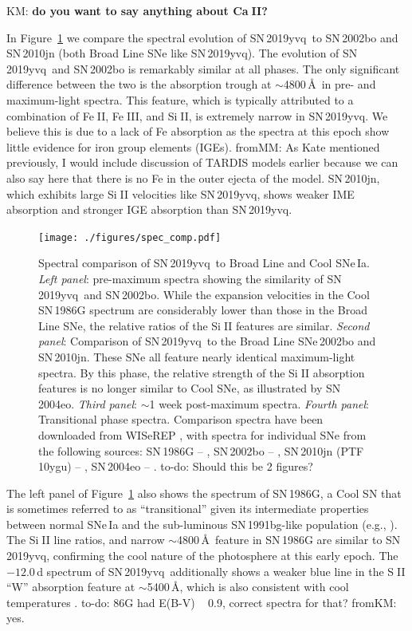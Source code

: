 \documentclass[twocolumn]{aastex63}
\def\ion#1#2{#1$\;${\footnotesize\rm{#2}}\relax}
\newcommand{\kate}[1]{{\color{red} KM: \textbf{#1}}}
\newcommand{\fromkate}[1]{{\color{brown} fromKM: {#1}}}
\newcommand{\frommark}[1]{{\color{orange} fromMM: {#1}}}
\newcommand{\todo}[1]{{\color{magenta} to-do: {#1}}}
\newcommand{\sn}{SN\,2019yvq}
\begin{document}
\kate{do you want to say anything about \ion{Ca}{II}?}


In Figure~\ref{fig:spec_comp} we compare the spectral evolution of \sn\ to
SN\,2002bo and SN\,2010jn (both \citet{Branch06} Broad Line SNe like \sn).
The evolution of \sn\ and SN\,2002bo is remarkably similar at all phases. The
only significant difference between the two is the absorption trough at
$\sim$4800\,\AA\ in pre- and maximum-light spectra. This feature, which is
typically attributed to a combination of \ion{Fe}{II}, \ion{Fe}{III}, and
\ion{Si}{II}, is extremely narrow in \sn. We believe this is due to a lack of
Fe absorption as the spectra at this epoch show little evidence for iron group
elements (IGEs). \frommark{As Kate mentioned previously, I would include discussion of TARDIS models earlier because we can also say here that there is no Fe in the outer ejecta of the model}. SN\,2010jn, which exhibits large \ion{Si}{II} velocities
like \sn, shows weaker IME absorption and stronger IGE absorption than \sn.

\begin{figure}
    \centering
    \texttt{[image: ./figures/spec\_comp.pdf]}
    \caption{Spectral comparison of \sn\ to \citet{Branch06} Broad Line and
    Cool SNe\,Ia. \textit{Left panel}: pre-maximum spectra showing the
    similarity of \sn\ and SN\,2002bo. While the expansion velocities in the
    Cool SN\,1986G spectrum are considerably lower than those in the Broad
    Line SNe, the relative ratios of the \ion{Si}{II} features are similar.
    \textit{Second panel}: Comparison of \sn\ to the Broad Line SNe\,2002bo
    and SN\,2010jn. These SNe all feature nearly identical maximum-light
    spectra. By this phase, the relative strength of the \ion{Si}{II}
    absorption features is no longer similar to \citet{Branch06} Cool SNe, as
    illustrated by SN\,2004eo. \textit{Third panel}: $\sim$1 week post-maximum
    spectra. \textit{Fourth panel}: Transitional phase spectra. Comparison
    spectra have been downloaded from WISeREP \citep{Yaron12}, with spectra
    for individual SNe from the following sources: SN\,1986G --
    \citet{Cristiani92}, SN\,2002bo -- \citet{Benetti04,Silverman11},
    SN\,2010jn (PTF\,10ygu) -- \citet{Hachinger13,Maguire14}, SN\,2004eo --
    \citet{Pastorello07}. \todo{Should this be 2 figures?}}
    \label{fig:spec_comp}
\end{figure}

The left panel of Figure~\ref{fig:spec_comp} also shows the spectrum of
SN\,1986G, a \citet{Branch06} Cool SN that is sometimes referred to as
``transitional'' given its intermediate properties between normal SNe\,Ia and
the sub-luminous SN\,1991bg-like population (e.g., \citealt{Pastorello07}).
The \ion{Si}{II} line ratios, and narrow $\sim$4800\,\AA\ feature in SN\,1986G
are similar to \sn, confirming the cool nature of the photosphere at this
early epoch. The $-12.0$\,d spectrum of \sn\ additionally shows a weaker blue
line in the \ion{S}{II} ``W'' absorption feature at $\sim$5400\,\AA, which is
also consistent with cool temperatures \citep{Nugent95}. \todo{86G had E(B-V)
~ 0.9, correct spectra for that?} \fromkate{yes.}
\end{document}
